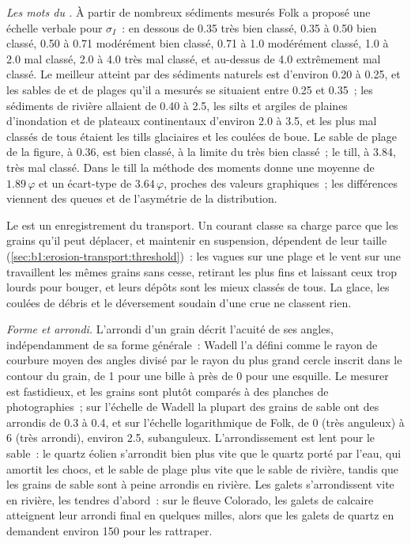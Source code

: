 \emph{Les mots du .} À partir de nombreux sédiments mesurés Folk a proposé une
échelle verbale pour $\sigma_I$~: en dessous de \num{0.35} très bien classé, \num{0.35} à
\num{0.50} bien classé, \num{0.50} à \num{0.71} modérément bien classé,
\num{0.71} à \num{1.0} modérément classé, \num{1.0} à \num{2.0} mal classé,
\num{2.0} à \num{4.0} très mal classé, et au-dessus de \num{4.0} extrêmement mal
classé. Le meilleur  atteint par des sédiments naturels est d'environ \num{0.20} à
\num{0.25}, et les sables de  et de plages qu'il a mesurés se situaient entre
\num{0.25} et \num{0.35}~; les sédiments de rivière allaient de \num{0.40} à \num{2.5},
les silts et argiles de plaines d'inondation et de plateaux continentaux d'environ \num{2.0} à \num{3.5},
et les plus mal classés de tous étaient les tills glaciaires et les coulées de boue. Le sable
de plage de la figure, à \num{0.36}, est bien classé, à la limite du très bien
classé~; le till, à \num{3.84}, très mal classé. Dans le till la méthode des
moments donne une moyenne de $1.89\,\varphi$ et un écart-type de
$3.64\,\varphi$, proches des valeurs graphiques~; les différences viennent des
queues et de l'asymétrie de la distribution.

Le  est un enregistrement du transport. Un courant classe sa charge parce que les
grains qu'il peut déplacer, et maintenir en suspension, dépendent de leur taille
(\cref{sec:b1:erosion-transport:threshold})~: les vagues sur une plage et le vent sur une
 travaillent les mêmes grains sans cesse, retirant les plus fins et laissant
ceux trop lourds pour bouger, et leurs dépôts sont les mieux classés de tous.
La glace, les coulées de débris et le déversement soudain d'une crue ne classent rien.

\emph{Forme et arrondi.} L'arrondi d'un grain décrit l'acuité de
ses angles, indépendamment de sa forme générale~: Wadell l'a défini comme le rayon
de courbure moyen des angles divisé par le rayon du plus grand cercle
inscrit dans le contour du grain, de 1 pour une bille à près de 0 pour une
esquille. Le mesurer est fastidieux, et les grains sont plutôt comparés à des planches
de photographies~; sur l'échelle de Wadell la plupart des grains de sable ont des arrondis de
\num{0.3} à \num{0.4}, et sur l'échelle logarithmique de Folk, de 0 (très
anguleux) à 6 (très arrondi), environ \num{2.5}, subanguleux. L'arrondissement est lent pour le
sable~: le quartz éolien s'arrondit bien plus vite que le quartz porté par l'eau, qui
amortit les chocs, et le sable de plage plus vite que le sable de rivière, tandis que les grains de sable
sont à peine arrondis en rivière. Les galets s'arrondissent vite en rivière, les tendres
d'abord~: sur le fleuve Colorado, les galets de calcaire atteignent leur arrondi final
en quelques milles, alors que les galets de quartz en demandent environ 150 pour les rattraper.


